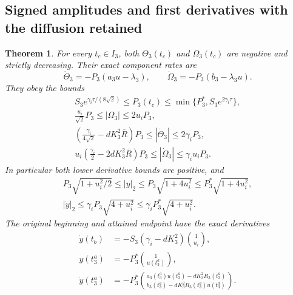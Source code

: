 \documentclass[11pt]{article}
\newtheorem{theorem}{Theorem}
\begin{document}
\subsection{Signed amplitudes and first derivatives with the diffusion retained}

\begin{theorem}\label{tgdc:first_derivatives}
For every $t_c\in I_3$, both $\Theta_3(t_c)$ and $\Omega_3(t_c)$
are negative and strictly decreasing. Their exact component rates are
\begin{equation}\label{tgdc:exact_first}
 \dot\Theta_3=-P_3(a_3u-\lambda_3),\qquad
 \dot\Omega_3=-P_3(b_3-\lambda_3u).
\end{equation}
They obey the bounds
\begin{equation}\label{tgdc:component_bounds}
\begin{gathered}
 S_3e^{\gamma_i\tau/(8\sqrt2)}
 \leq P_3(t_c)\leq\min\{P_3^*,S_3e^{2\gamma_i\tau}\},\\
 \frac{u_i}{\sqrt2}P_3\leq |\Omega_3|\leq2u_iP_3,\\
 \left(\frac{\gamma_i}{4\sqrt2}-dK_3^2\overline R\right)P_3
 \leq |\dot\Theta_3|\leq2\gamma_iP_3,\\
 u_i\left(\frac{\gamma_i}{2}-2dK_3^2\overline R\right)P_3
 \leq |\dot\Omega_3|\leq\gamma_i u_iP_3.
\end{gathered}
\end{equation}
In particular both lower derivative bounds are positive, and
\begin{equation}\label{tgdc:norm_bounds}
\begin{gathered}
 P_3\sqrt{1+u_i^2/2}\leq |y|_2
       \leq P_3\sqrt{1+4u_i^2}\leq P_3^*\sqrt{1+4u_i^2},\\
 |\dot y|_2\leq\gamma_iP_3\sqrt{4+u_i^2}
       \leq\gamma_iP_3^*\sqrt{4+u_i^2}.
\end{gathered}
\end{equation}
The original beginning and attained endpoint have the exact derivatives
\begin{equation}\label{tgdc:endpoint_derivatives}
\begin{aligned}
 \dot y(t_b)&=-S_3(\gamma_i-dK_3^2)\binom1{u_i},\\
 y(t_3^a)&=-P_3^*\binom1{u(t_3^a)},\\
 \dot y(t_3^a)&=-P_3^*
 \binom{a_3(t_3^a)u(t_3^a)-dK_3^2R_3(t_3^a)}
       {b_3(t_3^a)-dK_3^2R_3(t_3^a)u(t_3^a)}.
\end{aligned}
\end{equation}
\end{theorem}
\end{document}
